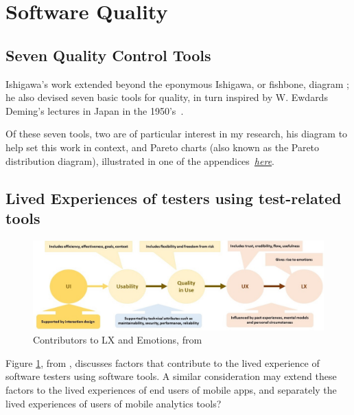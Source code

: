 \section{Software Quality}



\subsection{Seven Quality Control Tools}
Ishigawa's work extended beyond the eponymous Ishigawa, or fishbone, diagram %
; he also devised seven basic tools for quality, in turn inspired by W. Ewdards Deming's lectures in Japan in the 1950's~\cite{7_basic_quality_tools_with_R}.

Of these seven tools, two are of particular interest in my research, his diagram to help set this work in context, and Pareto charts (also known as the Pareto distribution diagram), illustrated in one of the appendices~\hyperlink{pareto.diagrams.in.r}{\emph{here}}.


\subsection{Lived Experiences of testers using test-related tools}
\begin{figure}
    \centering
    \includegraphics[width=15cm]{images/isabel-evans/Contributors_to_LX_v3.jpeg}
    \caption{Contributors to LX and Emotions, from~\citealp{evans2021_scared_frustrated_and_quietly_proud}}
    \label{fig:contributors-to-lx-and-emotions-v3}
\end{figure}

Figure \ref{fig:contributors-to-lx-and-emotions-v3}, from \citealp{evans2021_scared_frustrated_and_quietly_proud}, discusses factors that contribute to the lived experience of software testers using software tools. A similar consideration may extend these factors to the lived experiences of end users of mobile apps, and separately the lived experiences of users of mobile analytics tools?

